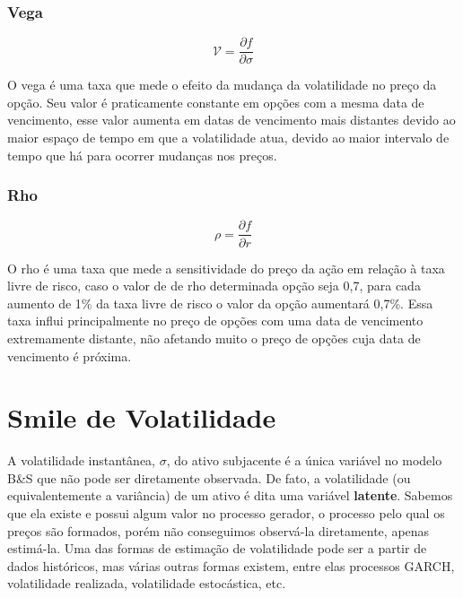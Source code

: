 \documentclass[]{book}
\begin{document}
\subsection{Vega}\label{vega}

\begin{equation}
\displaystyle {\mathcal {V}}=\frac{\partial f}{\partial \sigma} 
\label{eq:vega}
\end{equation}

O vega é uma taxa que mede o efeito da mudança da volatilidade no preço
da opção. Seu valor é praticamente constante em opções com a mesma data
de vencimento, esse valor aumenta em datas de vencimento mais distantes
devido ao maior espaço de tempo em que a volatilidade atua, devido ao
maior intervalo de tempo que há para ocorrer mudanças nos preços.

\subsection{Rho}\label{rho}

\begin{equation}
\displaystyle \rho =\frac{\partial f}{\partial r}
\label{eq:rho}
\end{equation}

O rho é uma taxa que mede a sensitividade do preço da ação em relação à
taxa livre de risco, caso o valor de de rho determinada opção seja 0,7,
para cada aumento de 1\% da taxa livre de risco o valor da opção
aumentará 0,7\%. Essa taxa influi principalmente no preço de opções com
uma data de vencimento extremamente distante, não afetando muito o preço
de opções cuja data de vencimento é próxima.

\chapter{Smile de Volatilidade}\label{smile}

A volatilidade instantânea, \(\sigma\), do ativo subjacente é a única
variável no modelo B\&S que não pode ser diretamente observada. De fato,
a volatilidade (ou equivalentemente a variância) de um ativo é dita uma
variável \textbf{latente}. Sabemos que ela existe e possui algum valor
no processo gerador, o processo pelo qual os preços são formados, porém
não conseguimos observá-la diretamente, apenas estimá-la. Uma das formas
de estimação de volatilidade pode ser a partir de dados históricos, mas
várias outras formas existem, entre elas processos GARCH, volatilidade
realizada, volatilidade estocástica, etc.
\end{document}
